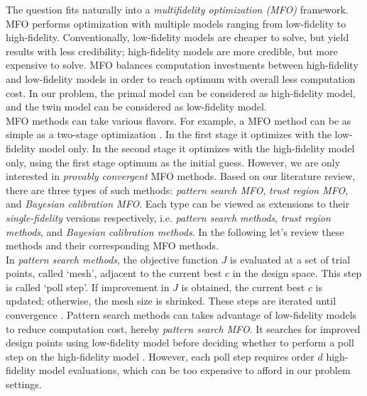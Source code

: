 \documentclass[a4paper,onecolumn]{article}
\theoremstyle{remark}
\begin{document}
\noindent The question fits naturally into a \emph{multifidelity optimization (MFO)} framework.
MFO performs optimization with multiple models ranging from
low-fidelity to high-fidelity. Conventionally, low-fidelity models are cheaper to solve, but yield
results with less credibility; high-fidelity models are more credible, but more expensive
to solve. MFO balances computation investments between high-fidelity and low-fidelity models
in order to reach optimum with overall less computation cost.
In our problem, the primal model can be considered as high-fidelity model, and the twin model
can be considered as low-fidelity model.\\

\noindent MFO methods can take various flavors.
For example, a MFO method can be as simple as a two-stage optimization \cite{MFO: two stage}. 
In the first stage it optimizes with the low-fidelity model only. In the second stage
it optimizes with the high-fidelity model only, using the first stage optimum as the initial guess.
However, we are only interested in \emph{provably convergent} MFO methods.
Based on our literature review, there are three types of such methods:
\emph{pattern search MFO}, \emph{trust region MFO}, and \emph{Bayesian calibration MFO}.
Each type can be viewed as 
extensions to their \emph{single-fidelity} versions respectively,
i.e. \emph{pattern search methods}, \emph{trust region methods}, and \emph{Bayesian 
calibration methods}. In the following let's review these methods and 
their corresponding MFO methods.\\

\noindent In \emph{pattern search methods}, the objective function $J$ is evaluated at a set of
trial points, called `mesh', adjacent to the current best $c$ in the design space. This
step is called `poll step'.
If improvement in $J$ is obtained, the current best $c$ is updated; otherwise, the mesh size
is shrinked. 
These steps are iterated until convergence \cite{Pattern Search Convergence}.
Pattern search methods can takes advantage of low-fidelity models to reduce computation cost,
hereby \emph{pattern search MFO}.
It searches for improved design 
points using low-fidelity model before deciding whether to perform a poll step on
the high-fidelity model \cite{Pattern Search Convergence MFO}.
However, each poll step requires order $d$ high-fidelity model evaluations, which can
be too expensive to afford in our problem settings.\\
\end{document}
